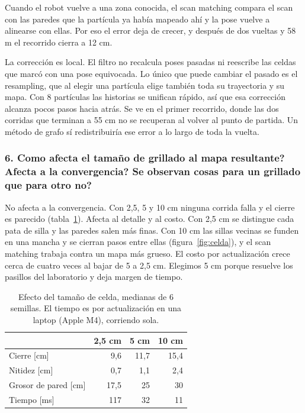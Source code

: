 Cuando el robot vuelve a una zona conocida, el scan matching compara el scan
con las paredes que la partícula ya había mapeado ahí y la pose vuelve a
alinearse con ellas. Por eso el error deja de crecer, y después de dos vueltas
y 58 m el recorrido cierra a 12 cm.

La corrección es local. El filtro no recalcula poses pasadas ni reescribe las
celdas que marcó con una pose equivocada. Lo único que puede cambiar el pasado
es el resampling, que al elegir una partícula elige también toda su trayectoria
y su mapa. Con 8 partículas las historias se unifican rápido, así que esa
corrección alcanza pocos pasos hacia atrás. Se ve en el primer recorrido, donde
las dos corridas que terminan a 55 cm no se recuperan al volver al punto de
partida. Un método de grafo sí redistribuiría ese error a lo largo de toda la
vuelta.

\subsubsection*{6. \textquestiondown{}Como afecta el tamaño de grillado al mapa resultante? \textquestiondown{}Afecta a la convergencia? \textquestiondown{}Se observan cosas para un grillado que para otro no?}

No afecta a la convergencia. Con 2,5, 5 y 10 cm ninguna corrida falla y el
cierre es parecido (tabla~\ref{tab:celda}). Afecta al detalle y al costo. Con
2,5 cm se distingue cada pata de silla y las paredes salen más finas. Con
10 cm las sillas vecinas se funden en una mancha y se cierran pasos entre ellas
(figura~\ref{fig:celda}), y el scan matching trabaja contra un mapa más grueso.
El costo por actualización crece cerca de cuatro veces al bajar de 5 a 2,5 cm.
Elegimos 5 cm porque resuelve los pasillos del laboratorio y deja margen de
tiempo.

\begin{table}[t]
  \centering\small
  \caption{Efecto del tamaño de celda, medianas de 6 semillas. El tiempo es por
    actualización en una laptop (Apple M4), corriendo sola.}
  \label{tab:celda}
  \begin{tabular}{@{}lrrr@{}}
    \toprule
    & 2,5 cm & 5 cm & 10 cm \\
    \midrule
    Cierre [cm] & 9,6 & 11,7 & 15,4 \\
    Nitidez [cm] & 0,7 & 1,1 & 2,4 \\
    Grosor de pared [cm] & 17,5 & 25 & 30 \\
    Tiempo [ms] & 117 & 32 & 11 \\
    \bottomrule
  \end{tabular}
\end{table}

